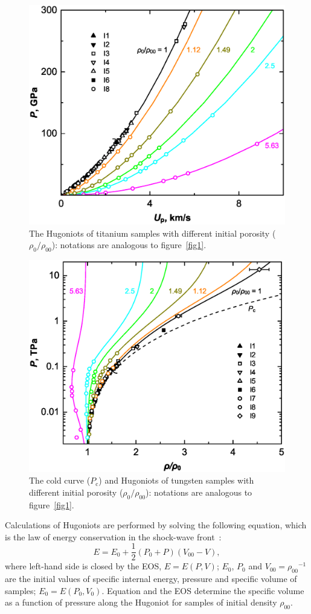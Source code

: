\documentclass[a4paper]{jpconf}
\begin{document}
\begin{figure}[t]
\centering\includegraphics[width=0.76\columnwidth]{fig3.eps}
\caption{The Hugoniots of titanium samples with different initial porosity ($\rho_0/\rho_{00}$): notations are analogous to figure~\ref{fig1}.
\label{fig3}
}
\end{figure}

\begin{figure}[t]
\centering\includegraphics[width=0.76\columnwidth]{fig4.eps}
\caption{The cold curve ($P_\mathrm{c}$) and Hugoniots of tungsten samples with different initial porosity ($\rho_0/\rho_{00}$): notations are analogous to figure~\ref{fig1}.
\label{fig4}
}
\end{figure}


Calculations of Hugoniots are performed by solving the following equation, which is the law of energy conservation in the shock-wave front~\cite{Zeldovich-Raizer-1967}:
\begin{equation}
E=E_0+\frac{1}{2}(P_0+P)(V_{00}-V),\label{Hug}
\end{equation}
where left-hand side is closed by the EOS, $E=E(P,V)$; $E_0$, $P_0$ and $V_{00}=\rho_{00}\!^{-1}$ are the initial values of specific internal energy, pressure and specific volume of samples; $E_0=E(P_0, V_0)$. Equation  and the EOS determine the specific volume as a function of pressure along the Hugoniot for samples of initial density $\rho_{00}$.
\end{document}
